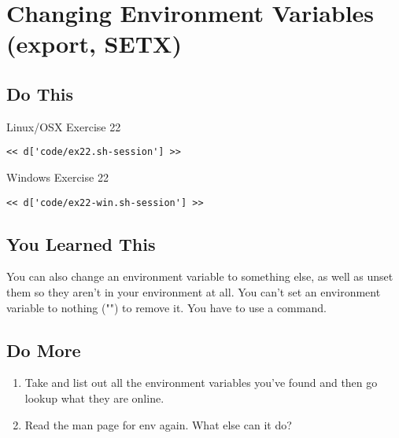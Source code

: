 \chapter{Changing Environment Variables (export, SETX)}

\section{Do This}

\begin{code}{Linux/OSX Exercise 22}
\begin{Verbatim}
<< d['code/ex22.sh-session'] >>
\end{Verbatim}
\end{code}

\begin{code}{Windows Exercise 22}
\begin{Verbatim}
<< d['code/ex22-win.sh-session'] >>
\end{Verbatim}
\end{code}

\section{You Learned This}

You can also change an environment variable to something else, as well as
unset them so they aren't in your environment at all.  You can't set an
environment variable to nothing ("") to remove it.  You have to use a 
command.

\section{Do More}

\begin{enumerate}
\item Take and list out all the environment variables you've found and 
    then go lookup what they are online.
\item Read the man page for env again.  What else can it do?
\end{enumerate}

